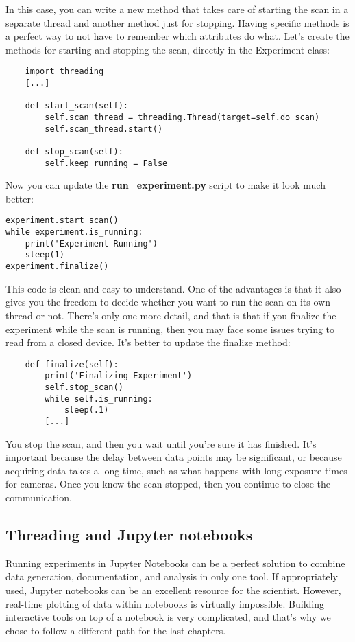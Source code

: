 In this case, you can write a new method that takes care of starting the scan in a separate thread and another method just for stopping. Having specific methods is a perfect way to not have to remember which attributes do what. Let's create the methods for starting and stopping the scan, directly in the Experiment class:

\begin{verbatim}
    import threading
    [...]

    def start_scan(self):
        self.scan_thread = threading.Thread(target=self.do_scan)
        self.scan_thread.start()

    def stop_scan(self):
        self.keep_running = False
\end{verbatim}

Now you can update the \textbf{run\_experiment.py} script to make it look much better:

\begin{verbatim}
experiment.start_scan()
while experiment.is_running:
    print('Experiment Running')
    sleep(1)
experiment.finalize()
\end{verbatim}

This code is clean and easy to understand. One of the advantages is that it also gives you the freedom to decide whether you want to run the scan on its own thread or not. There's only one more detail, and that is that if you finalize the experiment while the scan is running, then you may face some issues trying to read from a closed device. It's better to update the finalize method:

\begin{verbatim}
    def finalize(self):
        print('Finalizing Experiment')
        self.stop_scan()
        while self.is_running:
            sleep(.1)
        [...]
\end{verbatim}

You stop the scan, and then you wait until you're sure it has finished. It's important because the delay between data points may be significant, or because acquiring data takes a long time, such as what happens with long exposure times for cameras. Once you know the scan stopped, then you continue to close the communication.

\subsection{Threading and Jupyter notebooks}\label{subsec:jupyter}
Running experiments in Jupyter Notebooks can be a perfect solution to combine data generation, documentation, and analysis in only one tool. If appropriately used, Jupyter notebooks can be an excellent resource for the scientist. However, real-time plotting of data within notebooks is virtually impossible. Building interactive tools on top of a notebook is very complicated, and that's why we chose to follow a different path for the last chapters.

